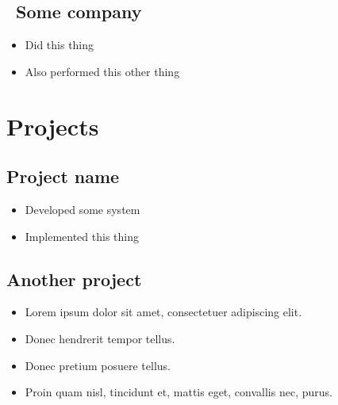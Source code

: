 \documentclass{article}
\begin{document}
	\subsection{\faIndustry~Some company}
	\begin{itemize}
		\item Did this thing
		\item Also performed this other thing
	\end{itemize}

\section{Projects}
	\subsection{Project name~\href{https://github.com/username/repo}{\underline{\faGithub}}}
	\begin{itemize}
		\item Developed some system
		\item Implemented this thing
	\end{itemize}

	\subsection{Another project~\href{https://github.com/username/repo}{\underline{\faGithub}}}
	\begin{itemize}
		\item Lorem ipsum dolor sit amet, consectetuer adipiscing elit.
		\item Donec hendrerit tempor tellus.
		\item Donec pretium posuere tellus.
		\item Proin quam nisl, tincidunt et, mattis eget, convallis nec, purus.
	\end{itemize}
\end{document}
